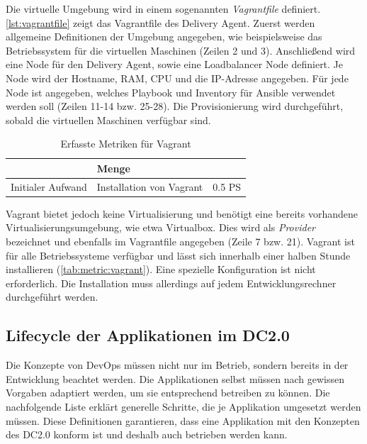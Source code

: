 Die virtuelle Umgebung wird in einem sogenannten \textit{Vagrantfile} definiert. \autoref{lst:vagrantfile} zeigt das Vagrantfile des Delivery Agent. Zuerst werden allgemeine Definitionen der Umgebung angegeben, wie beispielsweise das Betriebssystem für die virtuellen Maschinen (Zeilen 2 und 3). Anschließend wird eine Node für den Delivery Agent, sowie eine Loadbalancer Node definiert. Je Node wird der Hostname, RAM, CPU und die IP-Adresse angegeben. Für jede Node ist angegeben, welches Playbook und Inventory für Ansible verwendet werden soll (Zeilen 11-14 bzw. 25-28). Die Provisionierung wird durchgeführt, sobald die virtuellen Maschinen verfügbar sind.

\begin{table}[ht]
\setlength{\tabcolsep}{5pt}
\renewcommand{\arraystretch}{1.5}
\centering
\begin{tabular}{|l|l|l|}
\hline
\rowcolor[HTML]{C0C0C0}
\multicolumn{2}{|c|}{\textbf{Metrik}} 			& \textbf{Menge}		\\ 
\hline
Initialer Aufwand			& Installation von Vagrant	& 0.5 PS		\\ 
\hline
\end{tabular}
\caption{Erfasste Metriken für Vagrant}
\label{tab:metric:vagrant}
\end{table}

Vagrant bietet jedoch keine Virtualisierung und benötigt eine bereits vorhandene Virtualisierungsumgebung, wie etwa Virtualbox. Dies wird als \textit{Provider} bezeichnet und ebenfalls im Vagrantfile angegeben (Zeile 7 bzw. 21). Vagrant ist für alle Betriebssysteme verfügbar und lässt sich innerhalb einer halben Stunde installieren (\autoref{tab:metric:vagrant}). Eine spezielle Konfiguration ist nicht erforderlich. Die Installation muss allerdings auf jedem Entwicklungsrechner durchgeführt werden.

\subsection{Lifecycle der Applikationen im DC2.0}
\label{sec:lifecycle}
Die Konzepte von DevOps müssen nicht nur im Betrieb, sondern bereits in der Entwicklung beachtet werden. Die Applikationen selbst müssen nach gewissen Vorgaben adaptiert werden, um sie entsprechend betreiben zu können. Die nachfolgende Liste erklärt generelle Schritte, die je Applikation umgesetzt werden müssen. Diese Definitionen garantieren, dass eine Applikation mit den Konzepten des DC2.0 konform ist und deshalb auch betrieben werden kann. 

